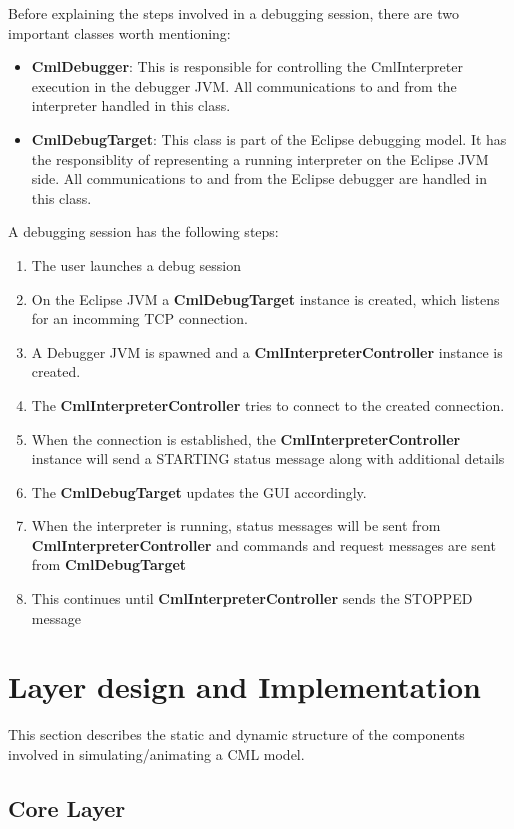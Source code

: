 \documentclass[a4paper, 10pt]{include/compassreport}   %
\begin{document}
Before explaining the steps involved in a debugging session, there are
two important classes worth mentioning:

\begin{itemize}
\item \textbf{CmlDebugger}: This is responsible for
  controlling the CmlInterpreter execution in the debugger JVM.  All
  communications to and from the interpreter handled in this class.
  
\item \textbf{CmlDebugTarget}: This class is part of the Eclipse
  debugging model. It has the responsiblity of representing a running
  interpreter on the Eclipse JVM side. All communications to and from
  the Eclipse debugger are handled in this class.
\end{itemize}

A debugging session has the following steps:
\begin{enumerate}
\item The user launches a debug session
\item On the Eclipse JVM a \textbf{CmlDebugTarget} instance is
  created, which listens for an incomming TCP connection.
\item A Debugger JVM is spawned and a
  \textbf{CmlInterpreterController} instance is created.
\item The \textbf{CmlInterpreterController} tries to connect to the
  created connection.
\item When the connection is established, the
  \textbf{CmlInterpreterController} instance will send a STARTING status
  message along with additional details
\item The \textbf{CmlDebugTarget} updates the GUI accordingly.
\item When the interpreter is running, status messages will be sent from \textbf{CmlInterpreterController} and commands and request messages are sent from \textbf{CmlDebugTarget}
\item This continues until \textbf{CmlInterpreterController} sends the STOPPED message
\end{enumerate}


\section{Layer design and Implementation}
This section describes the static and dynamic structure of the
components involved in simulating/animating a CML model.

\subsection{Core Layer}
\end{document}
